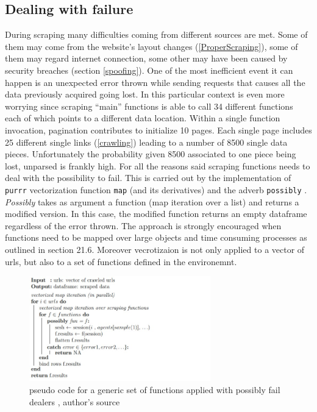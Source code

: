 \documentclass[
  12pt,
  a4paper,
  oneside]{book}
\theoremstyle{definition}
\theoremstyle{definition}
\theoremstyle{definition}
\theoremstyle{remark}
\begin{document}
\hypertarget{possibly}{%
\subsection{Dealing with failure}\label{possibly}}

During scraping many difficulties coming from different sources are met. Some of them may come from the website's layout changes (\ref{ProperScraping}), some of them may regard internet connection, some other may have been caused by security breaches (section \ref{spoofing}).
One of the most inefficient event it can happen is an unexpected error thrown while sending requests that causes all the data previously acquired going lost. In this particular context is even more worrying since scraping ``main'' functions is able to call 34 different functions each of which points to a different data location. Within a single function invocation, pagination contributes to initialize 10 pages. Each single page includes 25 different single links (\ref{crawling}) leading to a number of 8500 single data pieces. Unfortunately the probability given 8500 associated to one piece being lost, unparsed is frankly high.
For all the reasons said scraping functions needs to deal with the possibility to fail. This is carried out by the implementation of \texttt{purrr} vectorization function \texttt{map} (and its derivatives) and the adverb \texttt{possibly} \citet{possibly}. \emph{Possibly} takes as argument a function (map iteration over a list) and returns a modified version. In this case, the modified function returns an empty dataframe regardless of the error thrown. The approach is strongly encouraged when functions need to be mapped over large objects and time consuming processes as outlined in \citet{Rdatascience} section 21.6. Moreover vecrotizaion is not only applied to a vector of urls, but also to a set of functions defined in the environemnt.

\begin{figure}
\centering
\includegraphics[width=0.7\textwidth,height=\textheight]{images/pseudocode_latex/pseudocode_possibly.jpg}
\caption{\label{fig:pseudocode2}pseudo code for a generic set of functions applied with possibly fail dealers , author's source}
\end{figure}
\end{document}
